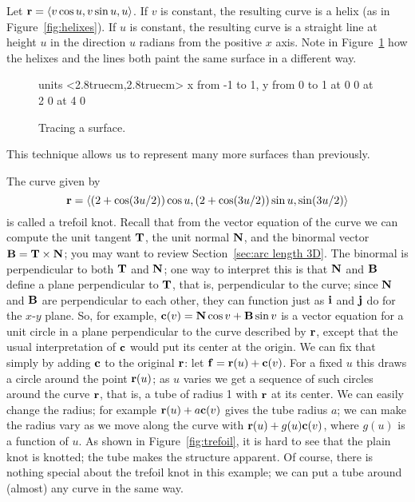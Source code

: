 \begin{example}{}{}
Let ${\bf r}=\langle v\cos u, v\sin u, u\rangle$. If $v$ is
constant, the resulting curve is a helix (as in
Figure~\ref{fig:helixes}). If $u$ is constant, the resulting curve
is a straight line at height $u$ in the direction $u$ radians from the
positive $x$ axis. Note in Figure~\ref{fig:helical ramp} how the
helixes and the lines both paint the same surface in a different way.
\end{example}

\begin{figure}[H]
\centerline{
\vbox{\beginpicture
\normalgraphs
\setcoordinatesystem units <2.8truecm,2.8truecm>
\setplotarea x from -1 to 1, y from 0 to 1
 at 0 0
 at 2 0
 at 4 0
\endpicture}}
\caption{Tracing a surface. \label{fig:helical ramp}}
\end{figure}

This technique allows us to represent many more surfaces than
previously. 

\begin{example}{}{}
The curve given by 
$${\bf r}=\langle (2+\cos(3u/2))\cos u,
(2+\cos(3u/2))\sin u, \sin(3u/2)\rangle$$
 is called a trefoil knot.
Recall that from the vector equation of the curve we can compute the
unit tangent $\bf T$, the unit normal $\bf N$, and the 
binormal vector ${\bf B}={\bf T}\times{\bf N}$; you may
want to review Section~\ref{sec:arc length 3D}. The binormal is
perpendicular to both $\bf T$ and $\bf N$; one way to interpret this
is that ${\bf N}$ and ${\bf B}$ define a plane perpendicular to $\bf
T$, that is, perpendicular to the curve; since ${\bf N}$ and ${\bf B}$
are perpendicular to each other, they can function just as $\bf i$ and
$\bf j$ do for the $x$-$y$ plane. So, for example, ${\bf c}(v)={\bf
  N}\cos v+{\bf B}\sin v$ is a vector equation for a unit circle in a plane
perpendicular to the curve described by $\bf r$, except that the usual
interpretation of $\bf c$ would put its center at the origin. We can
fix that simply by adding $\bf c$ to the original $\bf r$:
let ${\bf f}={\bf r}(u) +{\bf c}(v)$. For a
fixed $u$ this draws a circle around the point ${\bf r}(u)$; as $u$
varies we get a sequence of such circles around the curve $\bf r$,
that is, a tube of radius 1 with $\bf r$ at its center. We can easily
change the radius; for example ${\bf r}(u) +a{\bf c}(v)$
gives the tube radius $a$; we can make the radius vary as we
move along the curve with ${\bf r}(u) +g(u){\bf c}(v)$,
where $g(u)$ is a function of $u$. As shown in
Figure~\ref{fig:trefoil}, it is hard to see that the plain knot is
knotted; the tube makes the structure apparent. Of course, there is
nothing special about the trefoil knot in this example; we can put a
tube around (almost) any curve in the same way.
\end{example}


